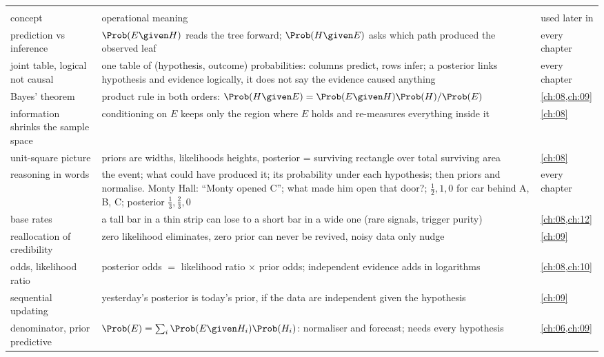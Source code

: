 \begin{center}
\small
\renewcommand{\arraystretch}{1.15}
\begin{tabularx}{\linewidth}{@{}>{\raggedright\arraybackslash}p{3.3cm}
                               >{\raggedright\arraybackslash}X
                               >{\raggedright\arraybackslash}p{2.7cm}@{}}
\toprule
\multicolumn{3}{@{}l}{\textbf{Bayes' theorem with a list of hypotheses}}\\
concept & operational meaning & used later in\\\midrule
prediction vs inference & $\Prob(E\given H)$ reads the tree forward; $\Prob(H\given E)$ asks which path produced the observed leaf & every chapter\\
joint table, logical not causal & one table of (hypothesis, outcome) probabilities: columns predict, rows infer; a posterior links hypothesis and evidence logically, it does not say the evidence caused anything & every chapter\\
Bayes' theorem & product rule in both orders: $\Prob(H\given E)=\Prob(E\given H)\Prob(H)/\Prob(E)$ & \cref{ch:08,ch:09}\\
information shrinks the sample space & conditioning on $E$ keeps only the region where $E$ holds and re-measures everything inside it & \cref{ch:08}\\
unit-square picture & priors are widths, likelihoods heights, posterior = surviving rectangle over total surviving area & \cref{ch:08}\\
reasoning in words & the event; what could have produced it; its probability under each hypothesis; then priors and normalise. Monty Hall: ``Monty opened C''; what made him open that door?; $\frac12,1,0$ for car behind A, B, C; posterior $\frac13,\frac23,0$ & every chapter\\
base rates & a tall bar in a thin strip can lose to a short bar in a wide one (rare signals, trigger purity) & \cref{ch:08,ch:12}\\
reallocation of credibility & zero likelihood eliminates, zero prior can never be revived, noisy data only nudge & \cref{ch:09}\\
odds, likelihood ratio & posterior odds $=$ likelihood ratio $\times$ prior odds; independent evidence adds in logarithms & \cref{ch:08,ch:10}\\
sequential updating & yesterday's posterior is today's prior, if the data are independent given the hypothesis & \cref{ch:09}\\
denominator, prior predictive & $\Prob(E)=\sum_i\Prob(E\given H_i)\Prob(H_i)$: normaliser and forecast; needs every hypothesis & \cref{ch:06,ch:09}\\
\bottomrule
\end{tabularx}
\end{center}

